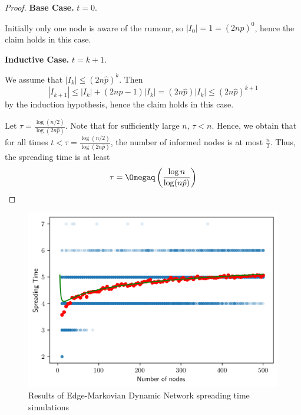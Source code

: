 \begin{proof}
	\textbf{Base Case.} $t=0$.

	Initially only one node is aware of the rumour, so $|I_0| = 1 = (2n\hat{p})^0$, hence the claim holds in this case.

	\textbf{Inductive Case.} $t=k+1$.

	We assume that $|I_k| \leq (2n\hat{p})^k$. Then 
	$$
		|I_{k+1}| \leq |I_k| + (2n\hat{p} - 1)|I_k| = (2n\hat{p})|I_k| \leq (2n\hat{p})^{k+1}
	$$
	by the induction hypothesis, hence the claim holds in this case.

	Let $\tau = \frac{\log (n/2)}{\log(2n\hat{p})}$. Note that for sufficiently large $n$, $\tau < n$. Hence, we obtain that for all times $t < \tau = \frac{\log (n/2)}{\log(2n\hat{p})}$, the number of informed nodes is at most $\frac{n}{2}$. Thus, the spreading time is at least 
	$$
		\tau = \Omegaq\left(\frac{\log n}{\log(n \hat{p})}\right)
	$$
\end{proof}


 

\begin{figure}[h]
	\centering
	\includegraphics[width=1\textwidth]{./figures/flooding_gnp_simulation_results.png}
	\caption{Results of Edge-Markovian Dynamic Network spreading time simulations}
	\label{fig:floodingGnpSimResults}
\end{figure}

